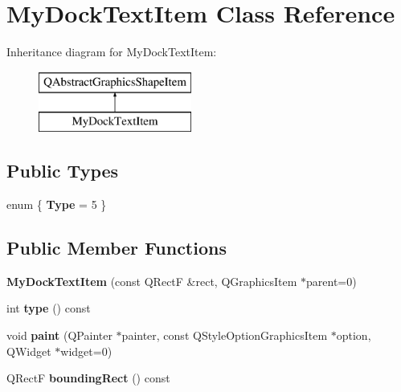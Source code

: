 \hypertarget{class_my_dock_text_item}{}\section{My\+Dock\+Text\+Item Class Reference}
\label{class_my_dock_text_item}
Inheritance diagram for My\+Dock\+Text\+Item\+:\begin{figure}[H]
\begin{center}
\leavevmode
\includegraphics[height=2.000000cm]{class_my_dock_text_item}
\end{center}
\end{figure}
\subsection*{Public Types}
\begin{DoxyCompactItemize}
\item 
\hypertarget{class_my_dock_text_item_a074d30a5cf2cabd19ce476cac37f6e84}{}enum \{ {\bfseries Type} = 5
 \}\label{class_my_dock_text_item_a074d30a5cf2cabd19ce476cac37f6e84}

\end{DoxyCompactItemize}
\subsection*{Public Member Functions}
\begin{DoxyCompactItemize}
\item 
\hypertarget{class_my_dock_text_item_a6cf92df4f4166fc82922edba23b4d887}{}{\bfseries My\+Dock\+Text\+Item} (const Q\+Rect\+F \&rect, Q\+Graphics\+Item $\ast$parent=0)\label{class_my_dock_text_item_a6cf92df4f4166fc82922edba23b4d887}

\item 
\hypertarget{class_my_dock_text_item_a121a427a41555d6395a6201577c2026b}{}int {\bfseries type} () const \label{class_my_dock_text_item_a121a427a41555d6395a6201577c2026b}

\item 
\hypertarget{class_my_dock_text_item_a68218bef6c0945e5bf3499b6a824c200}{}void {\bfseries paint} (Q\+Painter $\ast$painter, const Q\+Style\+Option\+Graphics\+Item $\ast$option, Q\+Widget $\ast$widget=0)\label{class_my_dock_text_item_a68218bef6c0945e5bf3499b6a824c200}

\item 
\hypertarget{class_my_dock_text_item_aa44a1ed17c5db699fd3e1ef62d432edc}{}Q\+Rect\+F {\bfseries bounding\+Rect} () const \label{class_my_dock_text_item_aa44a1ed17c5db699fd3e1ef62d432edc}

\end{DoxyCompactItemize}
